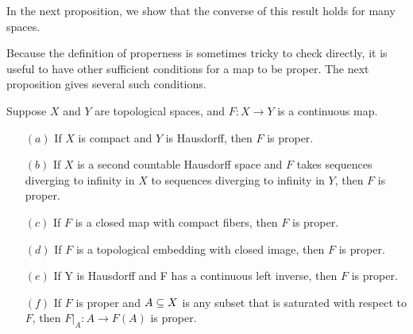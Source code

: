 In the next proposition, we show that the converse of this result holds for many spaces.\par
Because the definition of properness is sometimes tricky to check directly, it is useful to have other sufficient conditions for a map to be proper. The next proposition gives several such conditions.
\begin{proposition}\label{proper map if}
Suppose $X$ and $Y$ are topological spaces, and $F:X\to Y$ is a continuous map.
\begin{itemize}
\item[$(a)$]If $X$ is compact and $Y$ is Hausdorff, then $F$ is proper.
\item[$(b)$]If $X$ is a second countable Hausdorff space and $F$ takes sequences diverging
to infinity in $X$ to sequences diverging to infinity in $Y$, then $F$ is proper. 
\item[$(c)$]If $F$ is a closed map with compact fibers, then $F$ is proper.
\item[$(d)$]If $F$ is a topological embedding with closed image, then $F$ is proper.
\item[$(e)$]If Y is Hausdorff and F has a continuous left inverse, then $F$ is proper.
\item[$(f)$]If $F$ is proper and $A\subseteq X$ is any subset that is saturated with respect to $F$, then $F|_A:A\to F(A)$ is proper.
\end{itemize}
\end{proposition}
